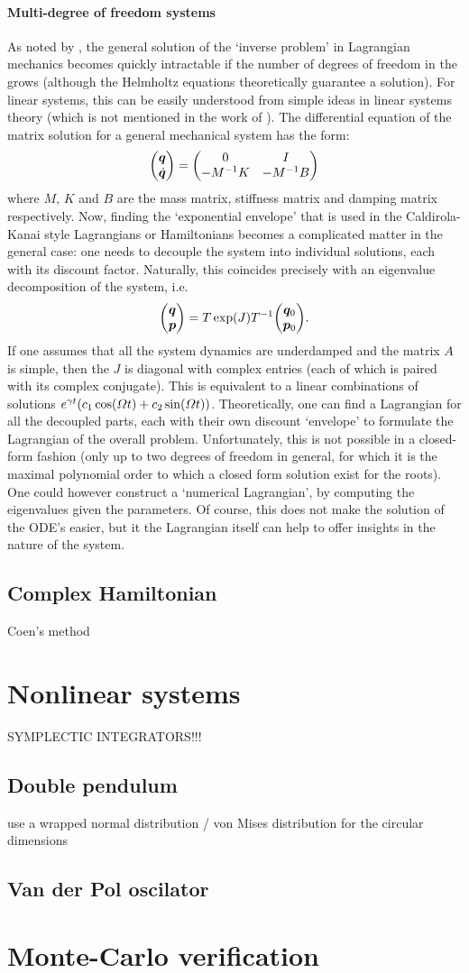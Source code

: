 \paragraph{Multi-degree of freedom systems}
As noted by \citet{Udwadia2013}, the general solution of the `inverse problem' in Lagrangian mechanics becomes quickly intractable if the number of degrees of freedom in the grows (although the Helmholtz equations theoretically guarantee a solution). For linear systems, this can be easily understood from simple ideas in linear systems theory (which is not mentioned in the work of \citet{Udwadia2013}). The differential equation of the matrix solution for a general mechanical system has the form:
$$ \mqty(\vec{q}\\\vec{\dot{q}}) = \mqty(0 & I \\ -M^{-1}K & -M^{-1}B) $$
where $M$, $K$ and $B$ are the mass matrix, stiffness matrix and damping matrix respectively. Now, finding the `exponential envelope' that is used in the Caldirola-Kanai style Lagrangians or Hamiltonians becomes a complicated matter in the general case: one needs to decouple the system into individual solutions, each with its discount factor. Naturally, this coincides precisely with an eigenvalue decomposition of the system, i.e.
$$ \mqty(\vec{q}\\\vec{p}) = T\exp(J)T^{-1}\mqty(\vec{q}_0\\\vec{p}_0). $$
If one assumes that all the system dynamics are underdamped and the matrix $A$ is simple, then the $J$ is diagonal with complex entries (each of which is paired with its complex conjugate). This is equivalent to a linear combinations of solutions $e^{\gamma t}\qty(c_1\cos(\Omega t) + c_2\sin(\Omega t))$. Theoretically, one can find a Lagrangian for all the decoupled parts, each with their own discount `envelope' to formulate the Lagrangian of the overall problem. Unfortunately, this is not possible in a closed-form fashion (only up to two degrees of freedom in general, for which it is the maximal polynomial order to which a closed form solution exist for the roots). One could however construct a `numerical Lagrangian', by computing the eigenvalues given the parameters. Of course, this does not make the solution of the ODE's easier, but it the Lagrangian itself can help to offer insights in the nature of the system.

\subsection{Complex Hamiltonian}
Coen's method

\section{Nonlinear systems}
SYMPLECTIC INTEGRATORS!!!
\subsection{Double pendulum}
use a wrapped normal distribution / von Mises distribution for the circular dimensions


\subsection{Van der Pol oscilator}

\section{Monte-Carlo verification}

